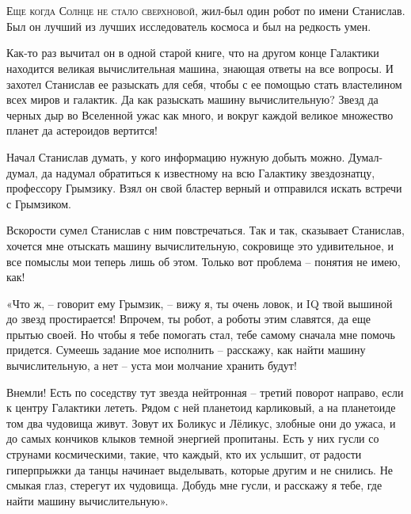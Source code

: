 \documentclass[ebook,oneside,final,openright]{memoir}
\begin{document}
\chapter{}
 \lettrine{Е}{ще когда Солнце не стало сверхновой,} жил-был один робот по имени Станислав. Был он лучший из лучших исследователь космоса и был на редкость умен.\par
\par
Как-то раз вычитал он в одной старой книге, что на другом конце Галактики находится великая вычислительная машина, знающая ответы на все вопросы. И захотел Станислав ее разыскать для себя, чтобы с ее помощью стать властелином всех миров и галактик. Да как разыскать машину вычислительную? Звезд да черных дыр во Вселенной ужас как много, и вокруг каждой великое множество планет да астероидов вертится!\par
\par
Начал Станислав думать, у кого информацию нужную добыть можно. Думал-думал, да надумал обратиться к известному на всю Галактику звездознатцу, профессору Грымзику. Взял он свой бластер верный и отправился искать встречи с Грымзиком.\par
\par
Вскорости сумел Станислав с ним повстречаться. Так и так, сказывает Станислав, хочется мне отыскать машину вычислительную, сокровище это удивительное, и все помыслы мои теперь лишь об этом. Только вот проблема – понятия не имею, как!\par
\par
«Что ж, – говорит ему Грымзик, – вижу я, ты очень ловок, и IQ твой вышиной до звезд простирается! Впрочем, ты робот, а роботы этим славятся, да еще прытью своей. Но чтобы я тебе помогать стал, тебе самому сначала мне помочь придется. Сумеешь задание мое исполнить – расскажу, как найти машину вычислительную, а нет – уста мои молчание хранить будут!\par
\par
Внемли! Есть по соседству тут звезда нейтронная – третий поворот направо, если к центру Галактики лететь. Рядом с ней планетоид карликовый, а на планетоиде том два чудовища живут. Зовут их Боликус и Лёликус, злобные они до ужаса, и до самых кончиков клыков темной энергией пропитаны. Есть у них гусли со струнами космическими, такие, что каждый, кто их услышит, от радости гиперпрыжки да танцы начинает выделывать, которые другим и не снились. Не смыкая глаз, стерегут их чудовища. Добудь мне гусли, и расскажу я тебе, где найти машину вычислительную».\par
\par
\end{document}
